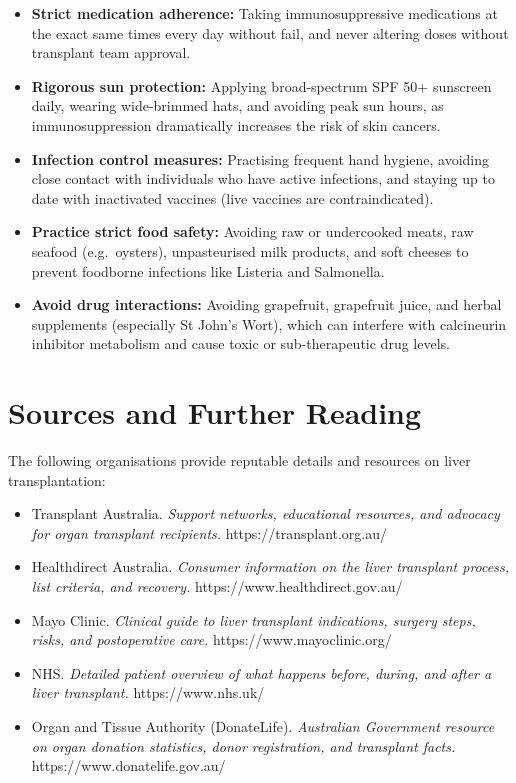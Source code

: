 \begin{itemize}
    \item \textbf{Strict medication adherence:} Taking immunosuppressive medications at the exact same times every day without fail, and never altering doses without transplant team approval.
    \item \textbf{Rigorous sun protection:} Applying broad-spectrum SPF 50+ sunscreen daily, wearing wide-brimmed hats, and avoiding peak sun hours, as immunosuppression dramatically increases the risk of skin cancers.
    \item \textbf{Infection control measures:} Practising frequent hand hygiene, avoiding close contact with individuals who have active infections, and staying up to date with inactivated vaccines (live vaccines are contraindicated).
    \item \textbf{Practice strict food safety:} Avoiding raw or undercooked meats, raw seafood (e.g.\ oysters), unpasteurised milk products, and soft cheeses to prevent foodborne infections like Listeria and Salmonella.
    \item \textbf{Avoid drug interactions:} Avoiding grapefruit, grapefruit juice, and herbal supplements (especially St John's Wort), which can interfere with calcineurin inhibitor metabolism and cause toxic or sub-therapeutic drug levels.
\end{itemize}

\section*{Sources and Further Reading}
The following organisations provide reputable details and resources on liver transplantation:

\begin{itemize}
    \item Transplant Australia. \textit{Support networks, educational resources, and advocacy for organ transplant recipients.} https://transplant.org.au/
    \item Healthdirect Australia. \textit{Consumer information on the liver transplant process, list criteria, and recovery.} https://www.healthdirect.gov.au/
    \item Mayo Clinic. \textit{Clinical guide to liver transplant indications, surgery steps, risks, and postoperative care.} https://www.mayoclinic.org/
    \item NHS. \textit{Detailed patient overview of what happens before, during, and after a liver transplant.} https://www.nhs.uk/
    \item Organ and Tissue Authority (DonateLife). \textit{Australian Government resource on organ donation statistics, donor registration, and transplant facts.} https://www.donatelife.gov.au/
\end{itemize}
